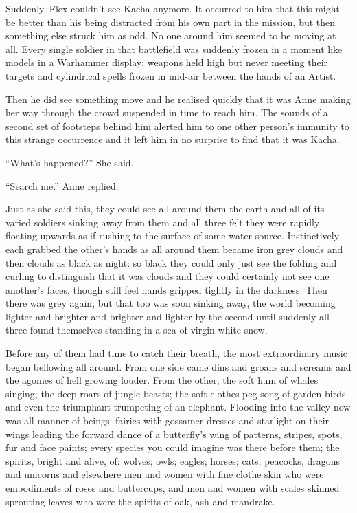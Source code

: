 Suddenly, Flex couldn’t see Kacha anymore. It occurred to him that
this might be better than his being distracted from his own part in
the mission, but then something else struck him as odd. No one around
him seemed to be moving at all. Every single soldier in that
battlefield was suddenly frozen in a moment like models in a Warhammer
display: weapons held high but never meeting their targets and
cylindrical spells frozen in mid-air between the hands of an Artist.

Then he did see something move and he realised quickly that it was
Anne making her way through the crowd suspended in time to reach
him. The sounds of a second set of footsteps behind him alerted him to
one other person’s immunity to this strange occurrence and it left him
in no surprise to find that it was Kacha.

“What’s happened?” She said.

“Search me.” Anne replied.

Just as she said this, they could see all around them the earth and
all of its varied soldiers sinking away from them and all three felt
they were rapidly floating upwards as if rushing to the surface of
some water source. Instinctively each grabbed the other’s hands as all
around them became iron grey clouds and then clouds as black as night:
so black they could only just see the folding and curling to
distinguish that it was clouds and they could certainly not see one
another’s faces, though still feel hands gripped tightly in the
darkness. Then there was grey again, but that too was soon sinking
away, the world becoming lighter and brighter and brighter and lighter
by the second until suddenly all three found themselves standing in a
sea of virgin white snow.

Before any of them had time to catch their breath, the most
extraordinary music began bellowing all around. From one side came
dins and groans and screams and the agonies of hell growing
louder. From the other, the soft hum of whales singing; the deep roars
of jungle beasts; the soft clothes-peg song of garden birds and even
the triumphant trumpeting of an elephant. Flooding into the valley now
was all manner of beings: fairies with gossamer dresses and starlight
on their wings leading the forward dance of a butterfly’s wing of
patterns, stripes, spots, fur and face paints; every species you could
imagine was there before them; the spirits, bright and alive, of:
wolves; owls; eagles; horses; cats; peacocks, dragons and unicorns and
elsewhere men and women with fine clothe skin who were embodiments of
roses and buttercups, and men and women with scales skinned sprouting
leaves who were the spirits of oak, ash and mandrake.

